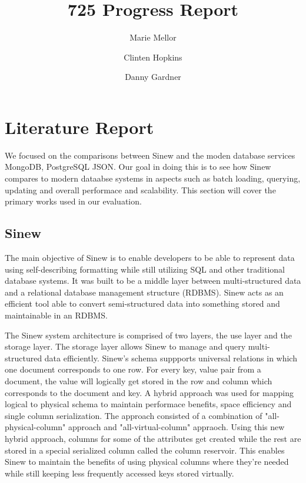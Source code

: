 \documentclass[sigconf]{acmart}
\begin{document}
\title{725 Progress Report}
\author{Marie Mellor \and Clinten Hopkins \and Danny Gardner}

\maketitle

\section{Literature Report}
    We focused on the comparisons between Sinew and the moden database services MongoDB, PostgreSQL JSON. Our goal in doing this is to see how Sinew compares to modern dataabse systems in aspects such as batch loading, querying, updating and overall performace and scalability. This section will cover the primary works used in our evaluation. 

    \subsection{Sinew}

    The main objective of Sinew\cite{Tahara_Diamond_Abadi_2014} is to enable developers to be able to represent data using self-describing formatting while still utilizing SQL and other traditional database systems. It was built to be a middle layer between multi-structured data and a relational database management structure (RDBMS). Sinew acts as an efficient tool able to convert semi-structured data into something stored and maintainable in an RDBMS. 

    The Sinew system architecture is comprised of two layers, the use layer and the storage layer. The storage layer allows Sinew to manage and query multi-structured data efficiently. Sinew's schema suppports universal relations in which one document corresponds to one row. For every key, value pair from a document, the value will logically get stored in the row and column which corresponds to the document and key. A hybrid approach was used for mapping logical to physical schema to maintain performace benefits, space efficiency and single column serialization. The approach consisted of a combination of "all-physical-column" approach and "all-virtual-column" appraoch. Using this new hybrid approach, columns for some of the attributes get created while the rest are stored in a special serialized column called the column reservoir. This enables Sinew to maintain the benefits of using physical columns where they're needed while still keeping less frequently accessed keys stored virtually. 
\end{document}
